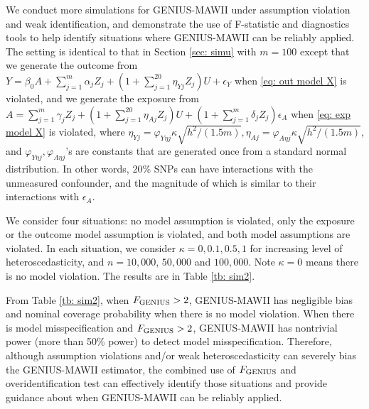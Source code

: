 \documentclass[12pt]{article}
\begin{document}
{We conduct more simulations for GENIUS-MAWII under  assumption violation and weak identification, and demonstrate the use of F-statistic and diagnostics tools to help identify situations where GENIUS-MAWII  can be reliably applied.  The setting is identical to that in Section \ref{sec: simu} with $m=100$  except that we generate the outcome from $	Y= \beta_0 A+ \sum_{j=1}^m  \alpha_j Z_j + (1+ \sum_{j=1}^{20}  \eta_{Yj}  Z_j ) U+ \epsilon_Y$ when \eqref{eq: out model X}  is violated, and we generate the exposure from  $ 	A= \sum_{j=1}^m  \gamma_j  Z_j + \left( 1 + \sum_{j=1}^{20}  \eta_{Aj}  Z_j \right)  U+ \left( 1 + \sum_{j=1}^m  \delta_j  Z_j \right) \epsilon_A$ when \eqref{eq: exp model X}  is violated, where
 $\eta_{Yj}  =  \varphi_{Y \eta j} \kappa \sqrt{ h^2 /(1.5m)}, \eta_{Aj}= \varphi_{A \eta j} \kappa \sqrt{ h^2 /(1.5m)} $, and $ \varphi_{Y \eta j}, \varphi_{A \eta j} $'s are constants that are generated once from a standard normal distribution. In other words, 20\% SNPs can have interactions with the unmeasured confounder, and the magnitude of which is similar to their interactions with $\epsilon_A$. 
 
 We consider four situations:  no model assumption is violated, only the exposure or the outcome model assumption is violated, and both model assumptions are violated. In each situation, we consider $\kappa=0, 0.1, 0.5, 1$ for increasing level of heteroscedasticity, and $n=10,000$,  $50,000$ and $ 100,000$. Note $\kappa=0$ means there is no model violation. The results are in Table \ref{tb: sim2}. 
 
From Table \ref{tb: sim2}, when $F_{\rm GENIUS}>2$, GENIUS-MAWII has negligible bias and nominal coverage probability when there is no model violation. When there is model misspecification and $F_{\rm GENIUS}>2$,  GENIUS-MAWII has nontrivial power (more than 50\% power) to detect model misspecification. Therefore, although assumption violations and/or weak heteroscedasticity can severely bias the GENIUS-MAWII estimator, the combined use of $F_{\rm GENIUS}$ and overidentification test can effectively identify those situations and provide guidance about when   GENIUS-MAWII can be reliably applied.
 





}
\end{document}
